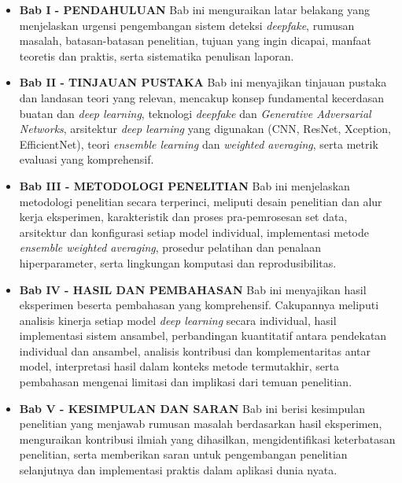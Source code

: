 \begin{itemize}
\item \textbf{Bab I - PENDAHULUAN}
Bab ini menguraikan latar belakang yang menjelaskan urgensi pengembangan sistem deteksi \textit{deepfake}, rumusan masalah, batasan-batasan penelitian, tujuan yang ingin dicapai, manfaat teoretis dan praktis, serta sistematika penulisan laporan.

\item \textbf{Bab II - TINJAUAN PUSTAKA}
Bab ini menyajikan tinjauan pustaka dan landasan teori yang relevan, mencakup konsep fundamental kecerdasan buatan dan \textit{deep learning}, teknologi \textit{deepfake} dan \textit{Generative Adversarial Networks}, arsitektur \textit{deep learning} yang digunakan (CNN, ResNet, Xception, EfficientNet), teori \textit{ensemble learning} dan \textit{weighted averaging}, serta metrik evaluasi yang komprehensif.

\item \textbf{Bab III - METODOLOGI PENELITIAN}
Bab ini menjelaskan metodologi penelitian secara terperinci, meliputi desain penelitian dan alur kerja eksperimen, karakteristik dan proses pra-pemrosesan set data, arsitektur dan konfigurasi setiap model individual, implementasi metode \textit{ensemble weighted averaging}, prosedur pelatihan dan penalaan hiperparameter, serta lingkungan komputasi dan reprodusibilitas.

\item \textbf{Bab IV - HASIL DAN PEMBAHASAN}
Bab ini menyajikan hasil eksperimen beserta pembahasan yang komprehensif. Cakupannya meliputi analisis kinerja setiap model \textit{deep learning} secara individual, hasil implementasi sistem ansambel, perbandingan kuantitatif antara pendekatan individual dan ansambel, analisis kontribusi dan komplementaritas antar model, interpretasi hasil dalam konteks metode termutakhir, serta pembahasan mengenai limitasi dan implikasi dari temuan penelitian.

\item \textbf{Bab V - KESIMPULAN DAN SARAN}
Bab ini berisi kesimpulan penelitian yang menjawab rumusan masalah berdasarkan hasil eksperimen, menguraikan kontribusi ilmiah yang dihasilkan, mengidentifikasi keterbatasan penelitian, serta memberikan saran untuk pengembangan penelitian selanjutnya dan implementasi praktis dalam aplikasi dunia nyata.
\end{itemize}